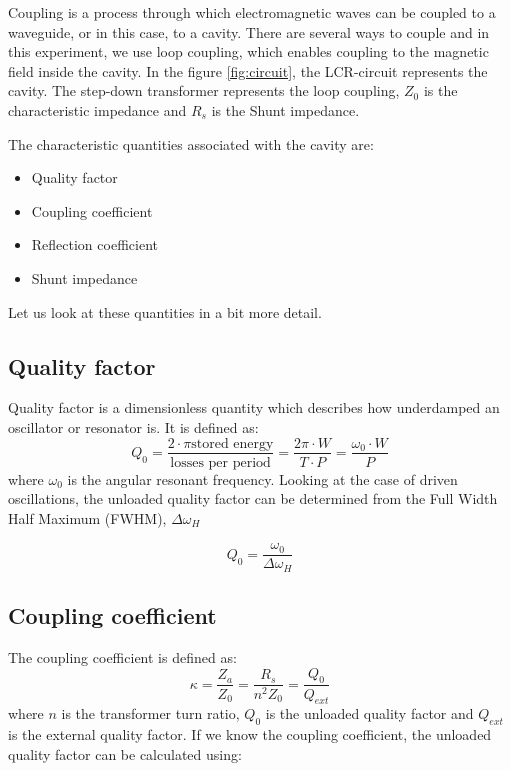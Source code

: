 \documentclass[a4paper]{article}
\numberwithin{equation}{section}
\begin{document}
Coupling is a process through which electromagnetic waves can be coupled to a
waveguide, or in this case, to a cavity. There are several ways to couple and in
this experiment, we use loop coupling, which enables coupling to the magnetic
field inside the cavity. In the figure \ref{fig:circuit}, the LCR-circuit
represents the cavity. The step-down transformer represents the loop coupling,
$Z_{0}$ is the characteristic impedance and $R_{s}$ is the Shunt impedance. 

The characteristic quantities associated with the cavity are:
\begin{itemize}
		\item Quality factor 
		\item Coupling coefficient 
		\item Reflection coefficient 
		\item Shunt impedance
\end{itemize}

Let us look at these quantities in a bit more detail. 

\subsection{Quality factor}
Quality factor is a dimensionless quantity which describes how underdamped an
oscillator or resonator is. It is defined as: 
\begin{equation}
		Q_{0} = \frac{2 \cdot \pi \text{stored energy} }{\text{losses per period}} = \frac{2 \pi \cdot W }{T\cdot P} =  \frac{\omega_{0}\cdot W}{P}
\end{equation}
where $\omega_{0}$ is the angular resonant frequency. Looking at the case of
driven oscillations, the unloaded quality factor can be determined from the Full
Width Half Maximum (FWHM), $\Delta \omega_{H}$

\begin{equation} \label{eqn:fwhm}
		Q_{0} = \frac{\omega_{0}}{\Delta \omega_{H}}
\end{equation}

\subsection{Coupling coefficient}
The coupling coefficient is defined as:
\begin{equation} \label{eqn:coupling}
		\kappa = \frac{Z_{a}}{Z_{0}} = \frac{R_{s}}{n^2Z_{0}} = \frac{Q_{0}}{Q_{ext}}	
\end{equation}
where $n$ is the transformer turn ratio, $Q_{0}$ is the unloaded quality factor
and $Q_{ext}$ is the external quality factor.  
If we know the coupling coefficient, the unloaded quality factor can be
calculated using: 
\end{document}
